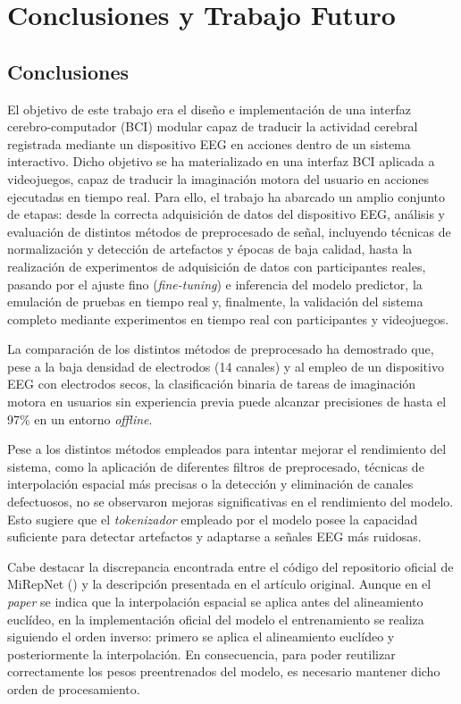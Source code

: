 \chapter{Conclusiones y Trabajo Futuro}
\label{cap:conclusiones_y_trabajo_futuro}

\section{Conclusiones}
\label{sec:conclusiones}
El objetivo de este trabajo era el diseño e implementación de una interfaz cerebro-computador (BCI) modular capaz de traducir la actividad cerebral registrada mediante un dispositivo EEG en acciones dentro de un sistema interactivo. Dicho objetivo se ha materializado en una interfaz BCI aplicada a videojuegos, capaz de traducir la imaginación motora del usuario en acciones ejecutadas en tiempo real. Para ello, el trabajo ha abarcado un amplio conjunto de etapas: desde la correcta adquisición de datos del dispositivo EEG, análisis y evaluación de distintos métodos de preprocesado de señal, incluyendo técnicas de normalización y detección de artefactos y épocas de baja calidad, hasta la realización de experimentos de adquisición de datos con participantes reales, pasando por el ajuste fino (\textit{fine-tuning}) e inferencia del modelo predictor, la emulación de pruebas en tiempo real y, finalmente, la validación del sistema completo mediante experimentos en tiempo real con participantes y videojuegos.

La comparación de los distintos métodos de preprocesado ha
demostrado que, pese a la baja densidad de electrodos (14 canales) y al empleo
de un dispositivo EEG con electrodos secos, la clasificación binaria de tareas
de imaginación motora en usuarios sin experiencia previa puede alcanzar
precisiones de hasta el 97\% en un entorno \textit{offline}.

Pese a los distintos métodos empleados para intentar mejorar el rendimiento del
sistema, como la aplicación de diferentes filtros de preprocesado, técnicas de
interpolación espacial más precisas o la detección y eliminación de canales
defectuosos, no se observaron mejoras significativas en el rendimiento del
modelo. Esto sugiere que el \textit{tokenizador} empleado por el modelo posee la
capacidad suficiente para detectar artefactos y adaptarse a señales EEG más
ruidosas.

Cabe destacar la discrepancia encontrada entre el código del repositorio
oficial de MiRepNet (\cite{liu2025mirepnetpipelinefoundationmodel}) y la
descripción presentada en el artículo original. Aunque en el \textit{paper} se indica que la interpolación espacial se aplica antes del alineamiento euclídeo, en la implementación oficial del modelo el entrenamiento se realiza siguiendo el orden inverso: primero se aplica el alineamiento euclídeo y posteriormente la interpolación. En consecuencia, para poder reutilizar correctamente los pesos preentrenados del modelo, es necesario mantener dicho orden de procesamiento.

